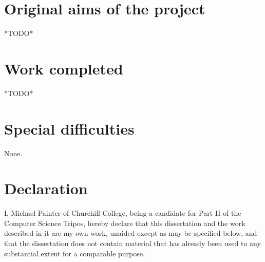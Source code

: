\documentclass[12pt,twoside,notitlepage]{report}
\begin{document}


\section*{Original aims of the project}
    *TODO*

\section*{Work completed}
    *TODO*

\section*{Special difficulties}
    None.
 





\cleardoublepage
\section*{Declaration}

I, Michael Painter of Churchill College, being a candidate for Part II of the Computer Science Tripos, hereby declare 
that this dissertation and the work described in it are my own work, unaided except as may be specified below, and that 
the dissertation does not contain material that has already been used to any substantial extent for a comparable 
purpose.

\bigskip
\bigskip
\bigskip
\bigskip

\leftline{\rule{6cm}{0.5pt}}

\bigskip
\bigskip
\bigskip
\bigskip

\leftline{\rule{4cm}{0.5pt}}











\cleardoublepage
\setcounter{tocdepth}{1}
\tableofcontents
\end{document}
